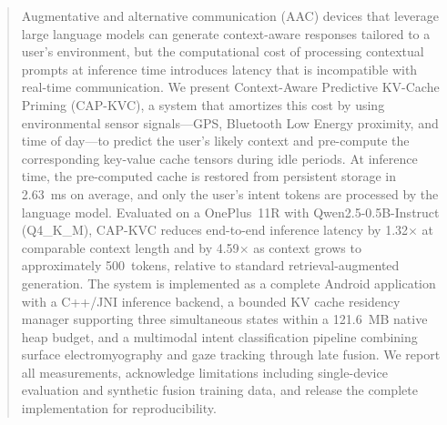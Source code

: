 \begin{abstract}
Augmentative and alternative communication (AAC) devices that leverage large language models can generate context-aware responses tailored to a user's environment, but the computational cost of processing contextual prompts at inference time introduces latency that is incompatible with real-time communication. We present Context-Aware Predictive KV-Cache Priming (CAP-KVC), a system that amortizes this cost by using environmental sensor signals---GPS, Bluetooth Low Energy proximity, and time of day---to predict the user's likely context and pre-compute the corresponding key-value cache tensors during idle periods. At inference time, the pre-computed cache is restored from persistent storage in 2.63~ms on average, and only the user's intent tokens are processed by the language model. Evaluated on a OnePlus~11R with Qwen2.5-0.5B-Instruct (Q4\_K\_M), CAP-KVC reduces end-to-end inference latency by 1.32$\times$ at comparable context length and by 4.59$\times$ as context grows to approximately 500~tokens, relative to standard retrieval-augmented generation. The system is implemented as a complete Android application with a C++/JNI inference backend, a bounded KV cache residency manager supporting three simultaneous states within a 121.6~MB native heap budget, and a multimodal intent classification pipeline combining surface electromyography and gaze tracking through late fusion. We report all measurements, acknowledge limitations including single-device evaluation and synthetic fusion training data, and release the complete implementation for reproducibility.
\end{abstract}
